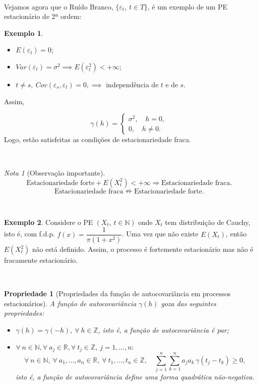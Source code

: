 \documentclass[
  11pt,
  a4paper,
]{book}
\newtheorem{proposition}{Propriedade}[chapter]
\theoremstyle{definition}
\theoremstyle{definition}
\newtheorem{example}{Exemplo}[chapter]
\theoremstyle{definition}
\theoremstyle{definition}
\theoremstyle{remark}
\newtheorem*{remark}{Nota }
\begin{document}
\(\,\)

Vejamos agora que o Ruído Branco, \(\{\varepsilon_t, ~t \in T\}\), é um exemplo de um PE
estacionário de 2ª ordem:

\begin{example}
\leavevmode

\begin{itemize}
\item
  \(E(\varepsilon_t)=0\);
\item
  \(Var(\varepsilon_t)=\sigma^2 \implies E(\varepsilon^2_t) < + \infty\);
\item
  \(t \neq s, ~Cov(\varepsilon_s,\varepsilon_t)=0, \implies\) independência de \(t\) e de \(s\).
\end{itemize}

Assim,

\[
\gamma(h)=
\begin{cases}
\sigma^2, \quad h=0,\\
0, \quad h \neq 0.
\end{cases}
\] Logo, estão satisfeitas as condições de estacionariedade fraca.

\end{example}

\(\,\)

\begin{remark}[Observação importante]
\[\text{Estacionariedade forte} + E(X_t^2) <+\infty \Rightarrow \text{Estacionariedade fraca}.\]
\[\text{Estacionariedade fraca} \nRightarrow \text{Estacionariedade forte}.\]
\end{remark}

\(\,\)

\begin{example}
Considere o PE \((X_t, ~t \in \mathbb{N})\) onde \(X_t\) tem distribuição de Cauchy, isto é, com
f.d.p. \(f(x)=\dfrac{1}{\pi(1+x^2)}\). Uma vez que não existe \(E(X_t)\), então \(E(X_t^2)\) não
está definido. Assim, o processo é fortemente estacionário mas não é fracamente
estacionário.
\end{example}

\(\,\)

\begin{proposition}[Propriedades da função de autocovariância em processos estacionários]

A função de autocovariância \(\gamma(h)\) goza das seguintes propriedades:

\begin{itemize}
\item
  \(\gamma(h)=\gamma(-h), ~ \forall ~h \in \mathbb{Z}\), isto é, a função de autocovariância é
  par;
\item
  \(\forall ~n \in \mathbb{N}, \forall ~a_j \in \mathbb{R}, \forall ~t_j \in \mathbb{Z}, ~j=1, \ldots,n:\)
  \[\forall~n \in \mathbb{N},~ \forall~a_1, \ldots, a_n \in \mathbb{R},~ \forall~t_1, \ldots, t_n \in \mathbb{Z}, \quad
    \sum_{j=1}^{n} \sum_{k=1}^{n} a_j a_k\, \gamma(t_j - t_k) \geq 0,\]
  isto é, a função de autocovariância define uma forma quadrática não-negativa.
\end{itemize}

\end{proposition}
\end{document}
